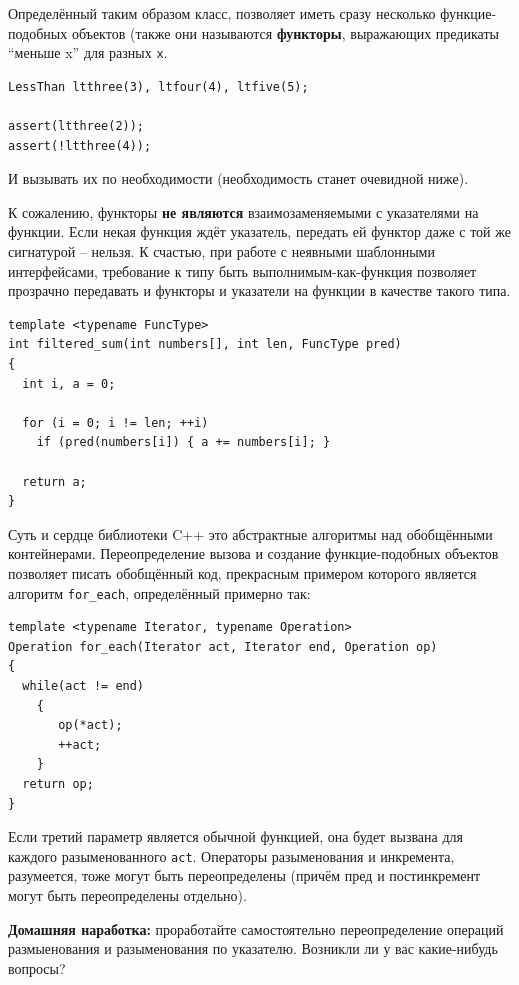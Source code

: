 \documentclass[a4paper,12pt,oneside]{article}
\begin{document}
Определённый таким образом класс, позволяет иметь сразу несколько функцие-подобных объектов (также они называются \textbf{функторы}, выражающих предикаты ``меньше x'' для разных \lstinline!x!.

\begin{lstlisting}
LessThan ltthree(3), ltfour(4), ltfive(5);

assert(ltthree(2));
assert(!ltthree(4));
\end{lstlisting}

И вызывать их по необходимости (необходимость станет очевидной ниже).

К сожалению, функторы \textbf{не являются} взаимозаменяемыми с указателями на функции. Если некая функция ждёт указатель, передать ей функтор даже с той же сигнатурой -- нельзя. К счастью, при работе с неявными шаблонными интерфейсами, требование к типу быть выполнимым-как-функция позволяет прозрачно передавать и функторы и указатели на функции в качестве такого типа.
 
\begin{lstlisting}
template <typename FuncType>
int filtered_sum(int numbers[], int len, FuncType pred)
{
  int i, a = 0;

  for (i = 0; i != len; ++i)
    if (pred(numbers[i]) { a += numbers[i]; }

  return a;
}
\end{lstlisting}

Суть и сердце библиотеки C++ это абстрактные алгоритмы над обобщёнными контейнерами. Переопределение вызова и создание функцие-подобных объектов позволяет писать обобщённый код, прекрасным примером которого является алгоритм \lstinline!for_each!, определённый примерно так:

\begin{lstlisting}
template <typename Iterator, typename Operation>
Operation for_each(Iterator act, Iterator end, Operation op)
{
  while(act != end)
    {
       op(*act);
       ++act;
    }
  return op;
}
\end{lstlisting}

Если третий параметр является обычной функцией, она будет вызвана для каждого разыменованного \lstinline!act!. Операторы разыменования и инкремента, разумеется, тоже могут быть переопределены (причём пред и постинкремент могут быть переопределены отдельно).

\textbf{Домашняя наработка:} проработайте самостоятельно переопределение операций размыенования и разыменования по указателю. Возникли ли у вас какие-нибудь вопросы?
\end{document}
